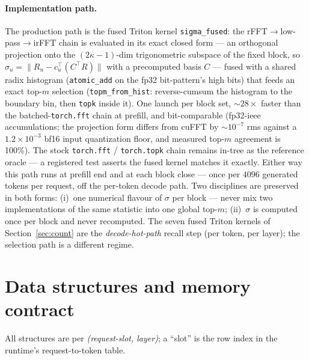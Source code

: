 \documentclass[11pt]{article}
\begin{document}
\paragraph{Implementation path.} The production path is the fused Triton
kernel \texttt{sigma\_fused}: the rFFT$\to$low-pass$\to$irFFT chain is
evaluated in its exact closed form --- an orthogonal projection onto the
$(2\kappa{-}1)$-dim trigonometric subspace of the fixed block, so
$\sigma_u = \lVert R_u - c_u^{\top}(C^{\top}R)\rVert$ with a precomputed
basis $C$ --- fused with a shared radix histogram (\texttt{atomic\_add} on
the fp32 bit-pattern's high bits) that feeds an exact top-$m$ selection
(\texttt{topm\_from\_hist}: reverse-cumsum the histogram to the boundary bin,
then \texttt{topk} inside it). One launch per block set, ${\sim}28\times$
faster than the batched-\texttt{torch.fft} chain at prefill, and
bit-comparable (fp32-ieee accumulations; the projection form differs from
cuFFT by ${\sim}10^{-7}$ rms against a $1.2{\times}10^{-3}$ bf16 input
quantization floor, and measured top-$m$ agreement is 100\%). The stock
\texttt{torch.fft} / \texttt{torch.topk} chain remains in-tree as the
reference oracle --- a registered test asserts the fused kernel matches it
exactly. Either way this path runs at prefill end and at each block close ---
once per $4096$ generated tokens per request, off the per-token decode path.
Two disciplines are preserved in both forms: (i)~one numerical flavour of
$\sigma$ per block --- never mix two implementations of the same statistic
into one global top-$m$; (ii)~$\sigma$ is computed once per block and never
recomputed. The seven fused Triton kernels of
Section~\ref{sec:count} are the \emph{decode-hot-path} recall step (per
token, per layer); the selection path is a different regime.

\section{Data structures and memory contract}\label{sec:data}

All structures are per \emph{(request-slot, layer)}; a ``slot'' is the row
index in the runtime's request-to-token table.
\end{document}
